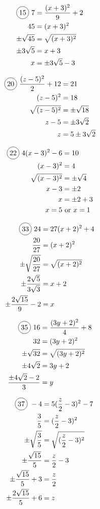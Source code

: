 \begin{multicols}{2}
\begin{align*}
  \circled{15}\ 7&=\frac{(x+3)^{2}}{9}+2\\
  45&=(x+3)^{2}\\
  \pm\sqrt{45}&=\sqrt{(x+3)^{2}}\\
  \pm 3\sqrt{5}&=x+3\\
  x&=\pm 3\sqrt{5}-3
\end{align*}

\begin{align*}
  \circled{20}\ \frac{(z-5)^{2}}{2}+12&=21\\
  (z-5)^{2}&=18\\
  \sqrt{(z-5)^{2}}&=\pm\sqrt{18}\\
  z-5&=\pm 3\sqrt{2}\\
  z&=5\pm 3\sqrt{2}
\end{align*}

\begin{align*}
  \circled{22}\ 4(x-3)^{2}-6&=10\\
  (x-3)^{2}&=4\\
  \sqrt{(x-3)^{2}}&=\pm\sqrt{4}\\
  x-3&=\pm 2\\
  x&=\pm 2+3\\
  x=5 &\text{ or }x=1
\end{align*}

\begin{align*}
  \circled{33}\ 24&=27(x+2)^{2}+4\\
  \frac{20}{27}&=(x+2)^{2}\\
  \pm\sqrt{\frac{20}{27}}&=\sqrt{(x+2)^{2}}\\
  \pm \frac{2\sqrt{5}}{3\sqrt{3}}&=x+2\\
  \pm \frac{2\sqrt{15}}{9}-2&=x
\end{align*}

\begin{align*}
  \circled{35}\ 16&=\frac{(3y+2)^{2}}{4}+8\\
  32&=(3y+2)^{2}\\
  \pm\sqrt{32}&=\sqrt{(3y+2)^{2}}\\
  \pm 4\sqrt{2}&=3y+2\\
  \frac{\pm 4\sqrt{2}-2}{3}&=y\\
\end{align*}

\begin{align*}
  \circled{37}\ -4&=5(\frac{z}{2}-3)^{2}-7\\
  \frac{3}{5}&=(\frac{z}{2}-3)^{2}\\
  \pm \sqrt{\frac{3}{5}}&=\sqrt{(\frac{z}{2}-3)^{2}}\\
  \pm \frac{\sqrt{15}}{5}&=\frac{z}{2}-3\\
  \pm \frac{\sqrt{15}}{5}+3&=\frac{z}{2}\\
  \pm \frac{2\sqrt{15}}{5}+6&=z
\end{align*}


\end{multicols}

